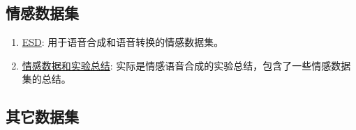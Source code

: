 \documentclass[cn,10pt,math=newtx,citestyle=gb7714-2015,bibstyle=gb7714-2015]{elegantbook}
\begin{document}
\subsection{情感数据集}
\begin{enumerate}
  \item \href{https://github.com/HLTSingapore/Emotional-Speech-Data}{ESD}: 用于语音合成和语音转换的情感数据集。
  \item \href{https://github.com/Emotional-Text-to-Speech/dl-for-emo-tts}{情感数据和实验总结}: 实际是情感语音合成的实验总结，包含了一些情感数据集的总结。
\end{enumerate}

\subsection{其它数据集}
\end{document}
